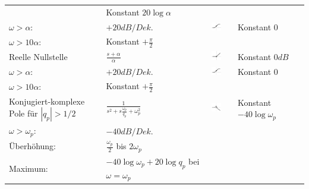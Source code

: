 \begin{landscape}
\begin{longtable}{|p{5cm}|l|ll|ll|}
\begin{tabular}{ll}
			$\omega < \alpha$: & Konstant $20 \log \alpha$ \\
			$\omega > \alpha$: & $+20dB/Dek.$
		\end{tabular} & 
		\parbox[c][1cm]{1cm}{\includegraphics[width=1cm]{./images/bode-approx-phase-5.png}}	&
		\begin{tabular}{ll}
			$\omega < \frac{\alpha}{10}$: & Konstant $0$ \\
			$\omega > 10 \alpha$: & Konstant $+\frac{\pi}{2}$
		\end{tabular}
	\\ \hline	
		Reelle Nullstelle &
		$\frac{s + \alpha}{\alpha}$ &
		\parbox[c][1cm]{1cm}{\includegraphics[width=1cm]{./images/bode-approx-ampl-5.png}} &
		\begin{tabular}{ll}
			$\omega < \alpha$: & Konstant $0dB$ \\
			$\omega > \alpha$: & $+20dB/Dek.$
		\end{tabular} &
		\parbox[c][1cm]{1cm}{\includegraphics[width=1cm]{./images/bode-approx-phase-5.png}} &
		\begin{tabular}{ll}
			$\omega < \frac{\alpha}{10}$: & Konstant $0$ \\
			$\omega > 10 \alpha$: & Konstant $+\frac{\pi}{2}$
		\end{tabular}
	\\ \hline
		Konjugiert-komplexe Pole \newline
    für $|q_p| > 1/2$ &
		$\frac{1}{s^2+s\frac{\omega_p}{q_p}+\omega_p^2}$ &
		\parbox[c][1cm]{1cm}{\includegraphics[width=1cm]{./images/bode-approx-ampl-6.png}} &
		\begin{tabular}{ll}
			$\omega < \omega_p$: 	& Konstant $-40 \log \omega_p$ \\
			$\omega > \omega_p$:	& $-40dB/Dek.$ \\
			Überhöhung: 			& $\frac{\omega_p}{2}$ bis $2\omega_p$ \\
			Maximum:				& $-40\log\omega_p + 20 \log q_p$ bei $\omega = \omega_p$			

\end{tabular}
\end{longtable}
\end{landscape}
